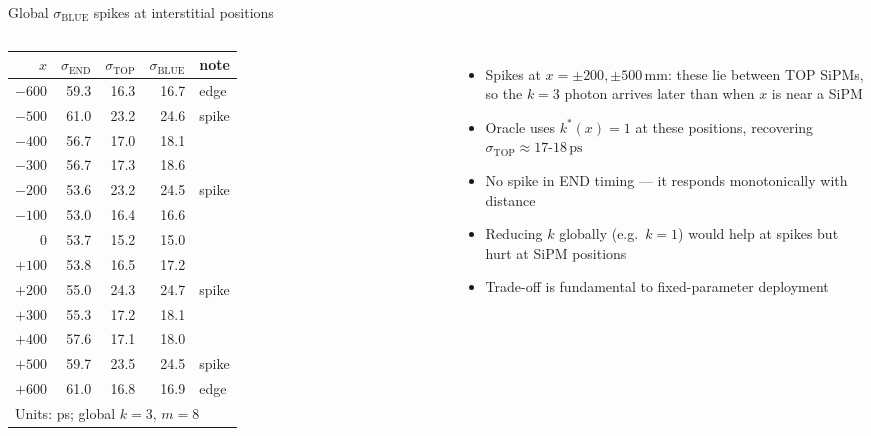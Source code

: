 \documentclass[aspectratio=169,9pt]{beamer}
\newcommand{\sEnd}{\sigma_{\mathrm{END}}}
\newcommand{\sTop}{\sigma_{\mathrm{TOP}}}
\newcommand{\sBlu}{\sigma_{\mathrm{BLUE}}}
\newcommand{\ps}{\ensuremath{\,\mathrm{ps}}}
\newcommand{\mm}{\ensuremath{\,\mathrm{mm}}}
\begin{document}
\begin{frame}{Global $\sBlu$ spikes at interstitial positions}
\begin{columns}[c]
\footnotesize
\begin{tabular}{rrrrl}
\toprule
$x$ & $\sEnd$ & $\sTop$ & $\sBlu$ & note \\
\midrule
$-600$ & 59.3 & 16.3 & 16.7 & edge \\
$-500$ & 61.0 & 23.2 & 24.6 & \textcolor{cRef}{spike} \\
$-400$ & 56.7 & 17.0 & 18.1 & \\
$-300$ & 56.7 & 17.3 & 18.6 & \\
$-200$ & 53.6 & 23.2 & 24.5 & \textcolor{cRef}{spike} \\
$-100$ & 53.0 & 16.4 & 16.6 & \\
$\phantom{+}0$ & 53.7 & 15.2 & 15.0 & \\
$+100$ & 53.8 & 16.5 & 17.2 & \\
$+200$ & 55.0 & 24.3 & 24.7 & \textcolor{cRef}{spike} \\
$+300$ & 55.3 & 17.2 & 18.1 & \\
$+400$ & 57.6 & 17.1 & 18.0 & \\
$+500$ & 59.7 & 23.5 & 24.5 & \textcolor{cRef}{spike} \\
$+600$ & 61.0 & 16.8 & 16.9 & edge \\
\bottomrule
\multicolumn{5}{l}{\scriptsize Units: ps; global $k=3$, $m=8$}
\end{tabular}
\begin{itemize}\setlength\itemsep{4pt}
  \item Spikes at $x=\pm200,\pm500\mm$: these lie
    between TOP SiPMs, so the $k=3$ photon
    arrives later than when $x$ is near a SiPM
  \item Oracle uses $k^*(x)=1$ at these positions,
    recovering $\sTop \approx 17$-$18\ps$
  \item No spike in END timing — it responds
    monotonically with distance
  \item Reducing $k$ globally (e.g.\ $k=1$) would
    help at spikes but hurt at SiPM positions
  \item Trade-off is fundamental to fixed-parameter
    deployment
\end{itemize}
\end{columns}
\end{frame}
\end{document}
